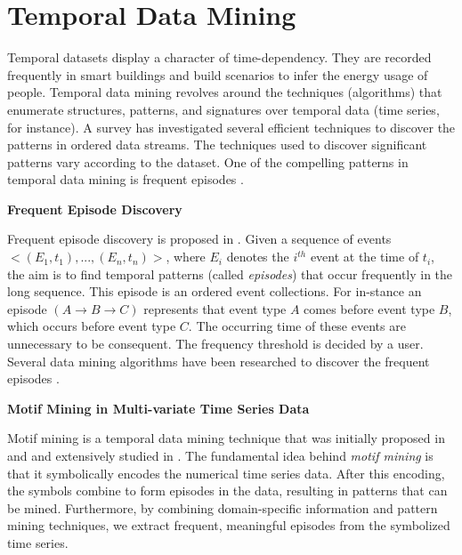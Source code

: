 \section{Temporal Data Mining}
Temporal datasets display a character of time-dependency. 
They are recorded frequently in smart buildings 
and build scenarios to infer the energy usage of people.
 Temporal data mining revolves around the techniques (algorithms) that enumerate structures, patterns, and signatures over temporal data (time series, for instance). 
 A survey \cite{laxman2006survey} has investigated several efficient 
 techniques to discover the patterns in ordered data streams.  
 The techniques used to discover significant patterns vary according to the dataset. 
 One of the compelling patterns in temporal data mining is frequent episodes \cite{mannila1997discovery}.

\textbf{Frequent Episode Discovery}

Frequent episode discovery is proposed in \cite{mannila1997discovery}. 
Given a sequence of events $<(E_1, t_1), ..., (E_n, t_n)>$, 
where $E_i$ denotes the $i^{th}$ event at the time of $t_i$, 
the aim is to find temporal patterns (called \textit{episodes}) that occur 
frequently in the long sequence. 
This episode is an ordered event collections. 
For in-stance an episode $(A\rightarrow B\rightarrow C)$ represents that event type $A$ comes before event type $B$, 
which occurs before event type $C$. 
The occurring time of these events are unnecessary to be consequent. 
The frequency threshold is decided by a user. 
 Several data mining algorithms have been researched to 
 discover the frequent episodes \cite{mannila1997discovery, laxman2005discovering}.
 
\textbf{Motif Mining in Multi-variate Time Series Data}

Motif mining is a temporal data mining technique that was initially proposed in ~\cite{motif1} and \cite{motif2} and extensively studied in \cite{minnen2007improving, tanaka2005discovery, motifgoal}. The fundamental idea behind \emph{motif mining} is that it symbolically encodes the numerical time series data. After this encoding, the symbols combine to form episodes in the data, resulting in patterns that can be mined. Furthermore, by combining domain-specific information and pattern mining techniques, we extract frequent,  meaningful episodes from the symbolized time series.

